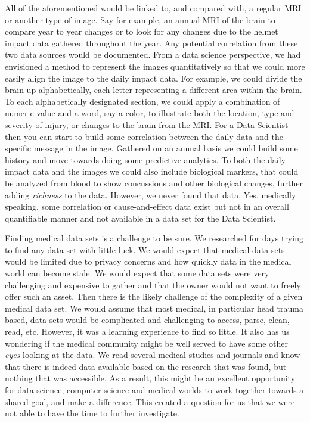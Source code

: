 \documentclass[sigconf]{acmart}
\begin{document}
All of the aforementioned would be linked to, and compared with, a regular MRI or another type of image.  Say for example, an annual MRI of the brain to compare year to year changes or to look for any changes due to the helmet impact data gathered throughout the year.  Any potential correlation from these two data sources would be documented.  From a data science perspective, we had envisioned a method to represent the images quantitatively so that we could more easily align the image to the daily impact data.  For example, we could divide the brain up alphabetically, each letter representing a different area within the brain.  To each alphabetically designated section, we could apply a combination of numeric value and a word, say a color, to illustrate both the location, type and severity of injury, or changes to the brain from the MRI.  For a Data Scientist then you can start to build some correlation between the daily data and the specific message in the image.  Gathered on an annual basis we could build some history and move towards doing some predictive-analytics.   To both the daily impact data and the images we could also include biological markers, that could be analyzed from blood to show concussions and other biological changes, further adding {\em richness} to the data.  However, we never found that data. Yes, medically speaking, some correlation or cause-and-effect data exist but not in an overall quantifiable manner and not available in a data set for the Data Scientist.

Finding medical data sets is a challenge to be sure.  We researched for days trying to find any data set with little luck.  We would expect that medical data sets would be limited due to privacy concerns and how quickly data in the medical world can become stale.  We would expect that some data sets were very challenging and expensive to gather and that the owner would not want to freely offer such an asset.  Then there is the likely challenge of the complexity of a given medical data set.  We would assume that most medical, in particular head trauma based, data sets would be complicated and challenging to access, parse, clean, read, etc.  However, it was a learning experience to find so little.  It also has us wondering if the medical community might be well served to have some other {\em eyes} looking at the data.  We read several medical studies and journals and know that there is indeed data available based on the research that was found, but nothing that was accessible.  As a result, this might be an excellent opportunity for data science, computer science and medical worlds to work together towards a shared goal, and make a difference.  This created a question for us that we were not able to have the time to further investigate.  
\end{document}
